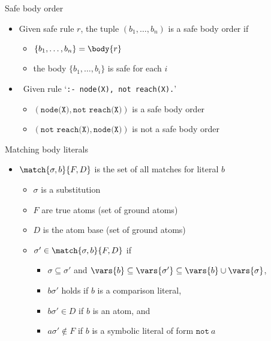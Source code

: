 \begin{frame}{Safe body order}
  \bigskip
  \begin{itemize}
  \item Given safe rule \(r\), the tuple \((b_1, \dots, b_n)\) is a \alert{safe body order} if
    \begin{itemize}\normalsize
    \item \(\{ b_1 ,\dots , b_n \} = \body{r} \)
      \smallskip
    \item the body \(\{b_1, \dots, b_i\}\) is safe for each \(i\)
    \end{itemize}
    \bigskip
  \item<2->  \ Given rule `\texttt{:- node(X), not reach(X).}'
    \begin{itemize}\normalsize
    \item \((\texttt{node(X)}, \texttt{not reach(X)})\) is a safe body order
      \smallskip
    \item \((\texttt{not reach(X)}, \texttt{node(X)})\) is not a safe body order
    \end{itemize}
  \end{itemize}
\end{frame}
\begin{frame}{Matching body literals}
  \bigskip
  \begin{itemize}
  \item \(\match{\sigma,b}{F,D}\) is the set of \alert{all matches for literal} \(b\)
    \begin{itemize}\normalsize
    \item \(\sigma\) is a substitution
    \item \(F\) are true atoms (set of ground atoms)
    \item \(D\) is the atom base (set of ground atoms)
      \medskip
    \item<2-> \(\sigma' \in \match{\sigma,b}{F,D}\) if
      \begin{itemize}\normalsize
      \item \(\sigma \subseteq \sigma'\) and \(\vars{b} \subseteq \vars{\sigma'} \subseteq \vars{b} \cup \vars{\sigma}\),
      \item \(b\sigma'\) holds if \(b\) is a comparison literal,
      \item \(b\sigma' \in D\) if \(b\) is an atom, and
      \item \(a\sigma' \not\in F\) if \(b\) is a symbolic literal of form \(\texttt{not}\ a\)
      \end{itemize}
    \end{itemize}
  \end{itemize}
\end{frame}
